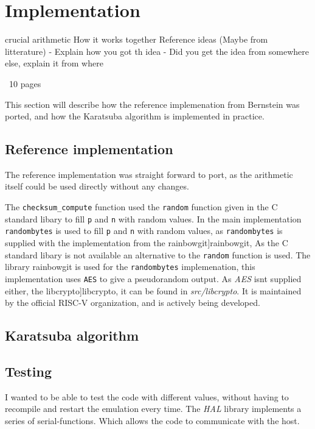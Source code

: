 \section{Implementation}
    crucial arithmetic
    How it works together
    Reference ideas (Maybe from litterature)
    - Explain how you got th idea
    - Did you get the idea from somewhere else, explain it from where

~10 pages

This section will describe how the reference implemenation from Bernstein was ported, and how the Karatsuba algorithm is implemented in practice.
\subsection{Reference implementation}
The reference implementation was straight forward to port, as the arithmetic itself could be used directly without any changes.


The \texttt{checksum\_compute} function used the \texttt{random\(\)} function given in the C standard libary to fill \texttt{p} and \texttt{n} with random values. In the main implementation \texttt{randombytes\(\)} is used to fill \texttt{p} and \texttt{n} with random values, as \texttt{randombytes\(\)} is supplied with the implementation from the rainbowgit\citeimplemenation]{rainbowgit}, 
As the C standard libary is not available an alternative to the \texttt{random\(\)} function is used. The library rainbowgit\cite{rainbowgit} is used for the \texttt{randombytes\(\)} implemenation, this implementation uses \texttt{AES} to give a pseudorandom output. As \textit{AES} isnt supplied either, the libcrypto\citelibrary]{libcrypto}, it can be found in \textit{src/libcrypto}. It is maintained by the official RISC-V organization, and is actively being developed.



\subsection{Karatsuba algorithm}


\subsection{Testing}
I wanted to be able to test the code with different values, without having to recompile and restart the emulation every time. The \textit{HAL} library implements a series of serial-functions. Which allows the code to communicate with the host.
